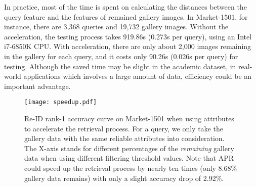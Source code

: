 \documentclass[5p,times,twocolumn]{elsarticle}
\begin{document}
In practice, most of the time is spent on calculating the distances between the query feature and the features of remained gallery images. In Market-1501, for instance, there are 3,368 queries and 19,732 gallery images. Without the acceleration, the testing process takes 919.86s (0.273s per query), using an Intel i7-6850K CPU. With acceleration, there are only about 2,000 images remaining in the gallery for each query, and it costs only 90.26s (0.026s per query) for testing. Although the saved time may be slight in the academic dataset, in real-world applications which involves a large amount of data, efficiency could be an important advantage.

\begin{figure}[!t]
        \begin{center}
            \texttt{[image: speedup.pdf]}
        \end{center}
        \caption{Re-ID rank-1 accuracy curve on Market-1501 when using attributes to accelerate the retrieval process. For a query, we only take the gallery data with the same reliable attributes into consideration. The X-axis stands for different percentages of the \emph{remaining} gallery data when using different filtering threshold values.  Note that APR could speed up the retrieval process by nearly ten times (only 8.68\% gallery data remains) with only a slight accuracy drop of 2.92\%.}
        \label{fig:attri_filter}
\end{figure}

\begin{comment}
    \setlength{\tabcolsep}{4.8pt}
    \begin{table}[!t]
        \small
        \renewcommand{\arraystretch}{1.0}
        \begin{center}
            \caption{Fine-grained recognition performance on CUB\_200\_2011 with ResNet50. ``attri'', ``bbox'' and ``part'' refer to attribute annotation, object bounding box and part annotations, respectively.}
            \begin{tabular}{l|c|c}
            \hline
            Methods&Annotation & Accuracy \\
            \hline
            Krause \emph{et al.}\cite{krause2015fine}& bbox& 82.8\\
Liu \emph{et al.}\cite{liu2016fully} & part&82.0 \\
            Part attribute-guided\cite{liu2017localizing} &attri &82.9 \\ 
Zheng \emph{et al.} \cite{zhedong2017unlabeled} &- &84.4\\
Zhang \emph{et al.} \cite{zhang2016picking}& -& \textbf{84.5}\\
 
            \hline
            Baseline~1 &- &80.08 \\ 
            APR &attri &83.19 \\ 
            \hline
            \end{tabular}
            \label{table:cub1}
        \end{center}
    \end{table}
\end{comment}
\end{document}
